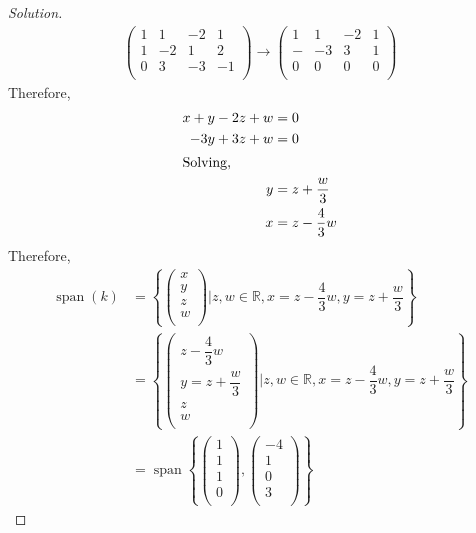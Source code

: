 \documentclass[fleqn, a4paper, 12pt]{article}
\theoremstyle{definition}
\theoremstyle{theorem}
\newenvironment{solution}
{\begin{proof}[Solution]\let\qed\relax}
	{\end{proof}}
\DeclareMathOperator{\vspan}{\mathrm{span}} %
\begin{document}
\begin{solution}
	\begin{align*}
		\begin{pmatrix}
			1 & 1 & -2 & 1\\
			1 & -2 & 1 & 2\\
			0 & 3 & -3 & -1\\
		\end{pmatrix}
		\to 
		\begin{pmatrix}
			1 & 1 & -2 & 1\\
			- & -3 & 3 & 1\\
			0 & 0 & 0 & 0\\
		\end{pmatrix}
	\end{align*}
	Therefore,
	\begin{align*}
	x + y - 2z + w &= 0\\
	-3y + 3z + w &= 0\\
	\intertext{Solving,}
	y &= z + \dfrac{w}{3}\\
	x &= z - \dfrac{4}{3} w
	\end{align*}
	Therefore,
	\begin{align*}
		\vspan(k) &= 
		\left\lbrace 
			\begin{pmatrix}
				x\\
				y\\
				z\\
				w\\
			\end{pmatrix} 
			\vert
			z, w \in \mathbb{R}, x = z - \dfrac{4}{3} w, y = z + \dfrac{w}{3}
		\right\rbrace\\
		&= 
		\left\lbrace 
			\begin{pmatrix}
				z - \dfrac{4}{3} w\\
				y = z + \dfrac{w}{3}\\
				z\\
				w\\
			\end{pmatrix} 
			\vert
			z, w \in \mathbb{R}, x = z - \dfrac{4}{3} w, y = z + \dfrac{w}{3}
		\right\rbrace\\
		&= \vspan 
		\left\lbrace 
			\begin{pmatrix}
				1\\
				1\\
				1\\
				0\\
			\end{pmatrix}
			,
			\begin{pmatrix}
				-4\\
				1\\
				0\\
				3\\
			\end{pmatrix}
		\right\rbrace 
	\end{align*}
\end{solution}
\end{document}
